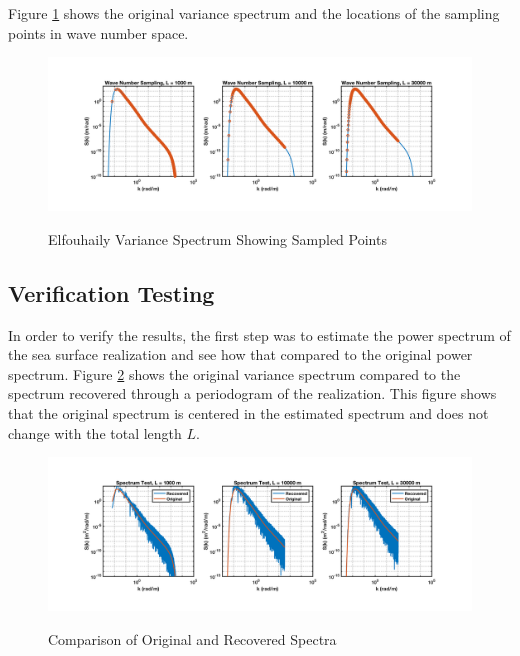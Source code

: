 Figure \ref{os_fig:8} shows the original variance spectrum and the locations of the sampling points in wave number space.
\begin{figure}[H]
  \begin{center}
\includegraphics[width=6in]{../media/Ocean_Surface/sampling_test.png}
  \end{center}
  \renewcommand{\baselinestretch}{1} \small\normalsize
  \begin{quote}
    \caption[Elfouhaily Variance Spectrum Showing Sampled Points]{Elfouhaily Variance Spectrum Showing Sampled Points\label{os_fig:8}}
  \end{quote}
\end{figure}
\renewcommand{\baselinestretch}{2} \small\normalsize

\subsection{Verification Testing}
In order to verify the results, the first step was to estimate the power spectrum of the sea surface realization and see how that compared to the original power spectrum. Figure \ref{os_fig:9} shows the original variance spectrum compared to the spectrum recovered through a periodogram of the realization. This figure shows that the original spectrum is centered in the estimated spectrum and does not change with the total length $L$.
\begin{figure}[H]
  \begin{center}
\includegraphics[width=6in]{../media/Ocean_Surface/power_spectrum_test.png}
  \end{center}
  \renewcommand{\baselinestretch}{1} \small\normalsize
  \begin{quote}
    \caption[Comparison of Original and Recovered Spectra]{Comparison of Original and Recovered Spectra\label{os_fig:9}}
  \end{quote}
\end{figure}
\renewcommand{\baselinestretch}{2} \small\normalsize

